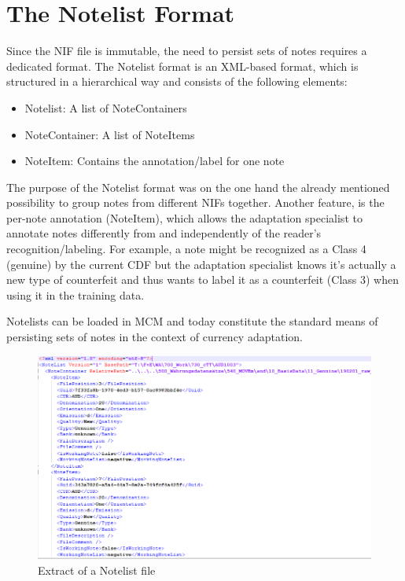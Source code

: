 \section{The Notelist Format}
\label{section:notelist}
Since the NIF file is immutable, the need to persist sets of notes requires a dedicated format. The Notelist format is an XML-based format, which is structured in a hierarchical way and consists of the following elements:
\begin{itemize}
	\item Notelist: A list of NoteContainers
	\item NoteContainer: A list of NoteItems
	\item NoteItem: Contains the annotation/label for one note
\end{itemize}
The purpose of the Notelist format was on the one hand the already mentioned possibility to group notes from different NIFs together. Another feature, is the per-note annotation (NoteItem), which allows the adaptation specialist to annotate notes differently from and independently of the reader's recognition/labeling. For example, a note might be recognized as a Class 4 (genuine) by the current CDF but the adaptation specialist knows it's actually a new type of counterfeit and thus wants to label it as a counterfeit (Class 3) when using it in the training data.\par
Notelists can be loaded in MCM and today constitute the standard means of persisting sets of notes in the context of currency adaptation.
\begin{figure}[ht!]
\includegraphics[width=1.0\textwidth]{images/Notelist.png}
  \caption{Extract of a Notelist file}\label{fig:notelist}
\end{figure}